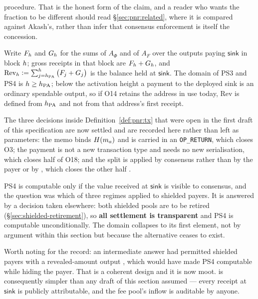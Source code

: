 \begin{definition}
\begin{description}
    procedure. That is the honest form of the claim, and a reader who wants the fraction to be
    different should read \S\ref{sec:pnr:related}, where it is compared against Akash's, rather than
    infer that consensus enforcement is itself the concession.
\end{description}
Write $F_{h}$ and $G_{h}$ for the sums of $A_\Phi$ and of $A_F$ over the outputs paying
$\mathsf{sink}$ in block $h$; gross receipts in that block are $F_{h} + G_{h}$, and
$\mathrm{Rev}_{h} \vcentcolon= \sum_{j = h_{\mathrm{PA}}}^{h}\big(F_j + G_j\big)$ is the balance held at
$\mathsf{sink}$. The domain of PS3 and PS4 is $h \ge h_{\mathrm{PA}}$; below the activation height a payment
to the deployed sink is an ordinary spendable output, so if O14 retains the address in use today,
$\mathrm{Rev}$ is defined from $h_{\mathrm{PA}}$ and not from that address's first receipt.
\end{definition}

The three decisions inside Definition~\ref{def:pnr:tx} that were open in the first draft of this
specification are now settled and are recorded here rather than left as parameters: the memo binds
$H(m_{a})$ and is carried in an \texttt{OP\_RETURN}, which closes O3; the payment is not a new
transaction type and needs no new serialisation, which closes half of O18; and the split is applied
by consensus rather than by the payer or by \FluxOS, which closes the other half
 .

\begin{remark}
\label{rem:o7-moot}
PS4 is computable only if the value received at $\mathsf{sink}$ is visible to consensus, and the
question was which of three regimes applied to shielded payers. It is answered by a decision taken
elsewhere: both shielded pools are to be retired (\S\ref{sec:shielded-retirement}), so
\textbf{all settlement is transparent} and PS4 is computable unconditionally. The domain collapses to
its first element, not by argument within this section but because the alternative ceases to exist.

Worth noting for the record: an intermediate answer had permitted shielded payers with a
revealed-amount output , which would have made PS4
computable while hiding the payer. That is a coherent design and it is now moot. \PNR{} is
consequently simpler than any draft of this section assumed --- every receipt at $\mathsf{sink}$ is
publicly attributable, and the fee pool's inflow is auditable by anyone.
\end{remark}


